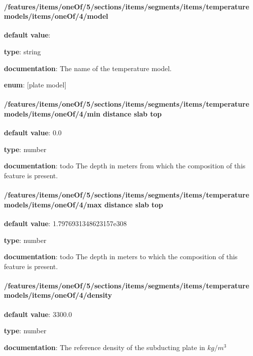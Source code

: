 \paragraph{/features/items/oneOf/5/sections/items/segments/items/temperature models/items/oneOf/4/model} \begin{itemized}
\item {\bf default value}: 
\item {\bf type}: string
\item {\bf documentation}: The name of the temperature model.
\item {\bf enum}: [plate model]\end{itemized}\paragraph{/features/items/oneOf/5/sections/items/segments/items/temperature models/items/oneOf/4/min distance slab top} \begin{itemized}
\item {\bf default value}: 0.0
\item {\bf type}: number
\item {\bf documentation}: todo The depth in meters from which the composition of this feature is present.
\end{itemized}\paragraph{/features/items/oneOf/5/sections/items/segments/items/temperature models/items/oneOf/4/max distance slab top} \begin{itemized}
\item {\bf default value}: 1.7976931348623157e308
\item {\bf type}: number
\item {\bf documentation}: todo The depth in meters to which the composition of this feature is present.
\end{itemized}\paragraph{/features/items/oneOf/5/sections/items/segments/items/temperature models/items/oneOf/4/density} \begin{itemized}
\item {\bf default value}: 3300.0
\item {\bf type}: number
\item {\bf documentation}: The reference density of the subducting plate in $kg/m^3$

\end{itemized}

